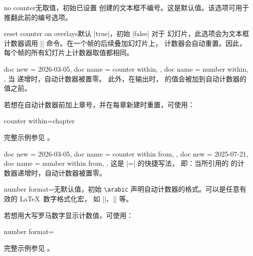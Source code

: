 \begin{newTcbKey}{no counter}{}{无取值，初始已设置}
  创建的文本框不编号。这是默认值。该选项可用于推翻此前的编号选项。
\end{newTcbKey}


\begin{newTcbKey}[][doc new=2019-10-18]{reset counter on overlays}{}{默认 |true|，初始 |false|}
  对于  幻灯片，此选项会为文本框计数器调用
  |\resetcounteronoverlays| 命令。在一个帧的后续叠加幻灯片上，
  计数器会自动重置。因此，每个帧的所有幻灯片上计数器取值都相同。
\end{newTcbKey}


\clearpage
\begin{newTcbKeys}[
    doc parameter   = {=\meta{counter}},
    doc description = {无默认值，初始未设置},
  ]{
    {
      doc new         = {2026-03-05},
      doc name        = counter within,
    },
    {
      doc name        = number within,
    },
  }
当  递增时，自动计数器被置零。
此外，在输出时， 的值会被加到自动计数器的值之前。\par
若想在自动计数器前加上章号，并在每章新建时重置，可使用：
\begin{dispListing}
counter within=chapter
\end{dispListing}
完整示例参见 。
\end{newTcbKeys}


\begin{newTcbKeys}[
    doc parameter   = {=\meta{tcolorbox}},
    doc description = {无默认值，初始未设置},
  ]{
    {
      doc new         = {2026-03-05},
      doc name        = counter within from,
    },
    {
      doc new         = {2025-07-21},
      doc name        = number within from,
    },
  }
这是 |=| 的快捷写法，
即：当所引用的  的计数器递增时，自动计数器被置零。
\end{newTcbKeys}


\begin{newTcbKey}{number format}{=}{无默认值，初始 \texttt{\textbackslash arabic}}
  声明自动计数器的格式。可以是任意有效的 \LaTeX\ 数字格式化宏，
  如 |\arabic|、|\roman| 等。\par
  若想用大写罗马数字显示计数值，可使用：
\begin{dispListing}
number format=\Roman
\end{dispListing}
完整示例参见 。
\end{newTcbKey}


